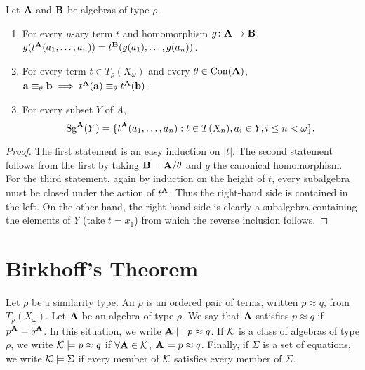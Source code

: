 \begin{theorem} 
  \label{thm:4.32} 
Let $\mathbf{A}$ and $\mathbf{B}$ be algebras of type $\rho$.
\begin{enumerate}
  \item
    For every $n$-ary term $t$ and homomorphism $g\colon \mathbf{A} \to \mathbf{B}$, 
    $g(t^{\mathbf{A}}(a_1,\dots, a_n)) = t^{\mathbf{B}}(g(a_1),\dots, g(a_n))$.
  \item
    For every term $t \in T_\rho(X_\omega)$ and every $\theta \in \operatorname{Con}(\mathbf{A})$, 
    $\mathbf{a} \equiv_\theta \mathbf{b} \implies t^{\mathbf{A}}(\mathbf{a}) \equiv_\theta t^{\mathbf{A}}(\mathbf{b})$.
  \item
    For every subset $Y$ of $A$,
    \[\operatorname{Sg}^{\mathbf{A}}(Y) = 
    \{ t^{\mathbf{A}}(a_1,\dots, a_n) : t \in T(X_n), a_i \in Y, i \leq n < \omega\}.\]
\end{enumerate}
\end{theorem}
\begin{proof} 
  The first statement is an easy induction on $|t|$. 
  The second statement follows from the first by taking $\mathbf{B} = \mathbf{A}/\theta$ 
  and $g$ the canonical homomorphism. For the third statement, again by induction on the 
  height of $t$, every subalgebra must be closed under the action of $t^{\mathbf{A}}$. 
  Thus the right-hand side is contained in the left. On the other hand, the right-hand 
  side is clearly a subalgebra containing the elements of $Y$ (take $t = x_1$) from 
  which the reverse inclusion follows.
\end{proof}

\section{Birkhoff's Theorem}
\begin{definition}
Let $\rho$ be a similarity type. 
An  $\rho$ is an ordered pair of terms, written 
$p \approx q$, from $T_\rho(X_\omega)$. Let $\mathbf{A}$ be an algebra of type $\rho$.
We say that $\mathbf{A}$ satisfies $p\approx q$ if $p^{\mathbf{A}} = q^{\mathbf{A}}$. 
In this situation, we write $\mathbf{A} \models p \approx q$.
If $\mathcal{K}$ is a class of algebras of type $\rho$, we write 
$\mathcal{K} \models p \approx q$ if $\forall \mathbf{A} \in \mathcal{K}$, 
$\mathbf{A} \models p \approx q$. Finally, if $\Sigma$ is a set of equations, 
we write $\mathcal{K} \models \Sigma$ if every member of $\mathcal{K}$ satisfies
every member of $\Sigma$.
\end{definition}


